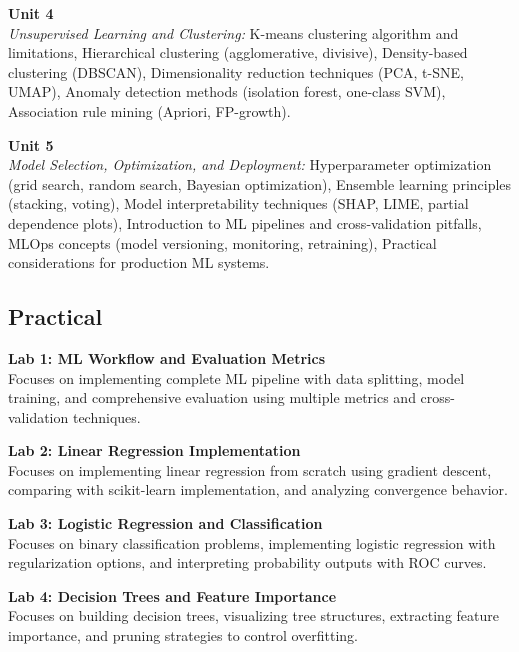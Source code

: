 \noindent\textbf{Unit 4} \\
\textit{Unsupervised Learning and Clustering:} K-means clustering algorithm and limitations, Hierarchical clustering (agglomerative, divisive), Density-based clustering (DBSCAN), Dimensionality reduction techniques (PCA, t-SNE, UMAP), Anomaly detection methods (isolation forest, one-class SVM), Association rule mining (Apriori, FP-growth).

\vspace{0.3cm}

\noindent\textbf{Unit 5} \\
\textit{Model Selection, Optimization, and Deployment:} Hyperparameter optimization (grid search, random search, Bayesian optimization), Ensemble learning principles (stacking, voting), Model interpretability techniques (SHAP, LIME, partial dependence plots), Introduction to ML pipelines and cross-validation pitfalls, MLOps concepts (model versioning, monitoring, retraining), Practical considerations for production ML systems.

\newpage

\subsection*{Practical}
\noindent\textbf{Lab 1: ML Workflow and Evaluation Metrics} \\
Focuses on implementing complete ML pipeline with data splitting, model training, and comprehensive evaluation using multiple metrics and cross-validation techniques.

\vspace{0.2cm}

\noindent\textbf{Lab 2: Linear Regression Implementation} \\
Focuses on implementing linear regression from scratch using gradient descent, comparing with scikit-learn implementation, and analyzing convergence behavior.

\vspace{0.2cm}

\noindent\textbf{Lab 3: Logistic Regression and Classification} \\
Focuses on binary classification problems, implementing logistic regression with regularization options, and interpreting probability outputs with ROC curves.

\vspace{0.2cm}

\noindent\textbf{Lab 4: Decision Trees and Feature Importance} \\
Focuses on building decision trees, visualizing tree structures, extracting feature importance, and pruning strategies to control overfitting.

